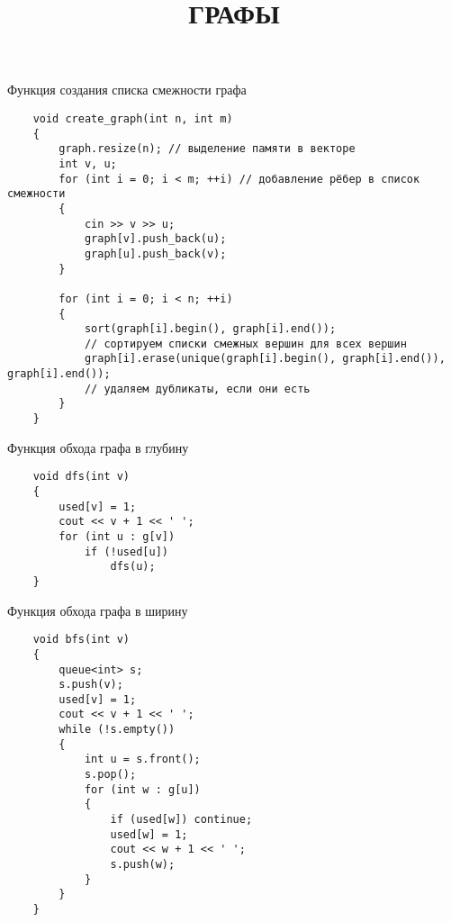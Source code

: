 \documentclass[a4paper, 14pt]{extarticle}
\author{}
\title{\MakeUppercase{Графы}}
\date{}
\begin{document}
\maketitle
\thispagestyle{empty}
\pagestyle{empty}

Функция создания списка смежности графа
\begin{verbatim}
    void create_graph(int n, int m)
    {
        graph.resize(n); // выделение памяти в векторе
        int v, u;
        for (int i = 0; i < m; ++i) // добавление рёбер в список смежности
        { 
            cin >> v >> u;
            graph[v].push_back(u);
            graph[u].push_back(v);
        }

        for (int i = 0; i < n; ++i) 
        {
            sort(graph[i].begin(), graph[i].end()); 
            // сортируем списки смежных вершин для всех вершин
            graph[i].erase(unique(graph[i].begin(), graph[i].end()), graph[i].end()); 
            // удаляем дубликаты, если они есть
        }
    }
\end{verbatim}

Функция обхода графа в глубину
\begin{verbatim}
    void dfs(int v)
    {
        used[v] = 1;
        cout << v + 1 << ' ';
        for (int u : g[v]) 
            if (!used[u]) 
                dfs(u);
    }
\end{verbatim}

Функция обхода графа в ширину
\begin{verbatim}
    void bfs(int v)
    {
        queue<int> s;
        s.push(v);
        used[v] = 1;
        cout << v + 1 << ' ';
        while (!s.empty())
        {
            int u = s.front();
            s.pop();
            for (int w : g[u])
            {
                if (used[w]) continue;
                used[w] = 1;
                cout << w + 1 << ' ';
                s.push(w);
            }
        }
    }
\end{verbatim}
\end{document}
